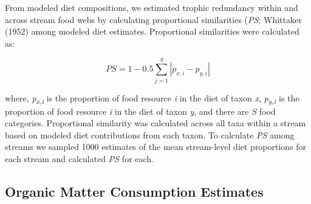 \documentclass[
]{article}
\begin{document}
From modeled diet compositions, we estimated trophic redundancy within
and across stream food webs by calculating proportional similarities
(\emph{PS}; Whittaker (1952) among modeled diet estimates. Proportional
similarities were calculated as:

\[ PS = 1 - 0.5 \sum_{j=1}^S|p_{x,i} - p_{y,i}|\]

where, \emph{p\textsubscript{x,i}} is the proportion of food resource
\emph{i} in the diet of taxon \emph{x}, \emph{p\textsubscript{y,i}} is
the proportion of food resource \emph{i} in the diet of taxon \emph{y},
and there are \emph{S} food categories. Proportional similarity was
calculated across all taxa within a stream based on modeled diet
contributions from each taxon. To calculate \emph{PS} among streams we
sampled 1000 estimates of the mean stream-level diet proportions for
each stream and calculated \emph{PS} for each.

\hypertarget{organic-matter-consumption-estimates}{%
\subsection{Organic Matter Consumption
Estimates}\label{organic-matter-consumption-estimates}}
\end{document}
